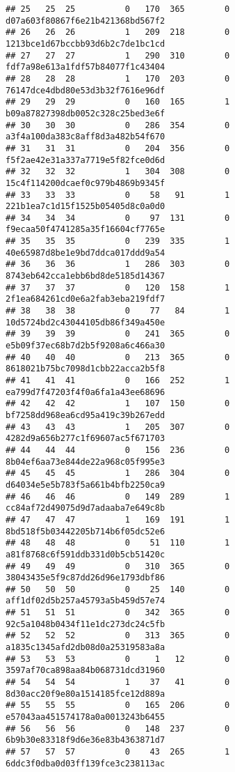 \documentclass[
]{article}
\begin{document}
\begin{verbatim}
## 25   25  25          0   170  365        0 d07a603f80867f6e21b421368bd567f2
## 26   26  26          1   209  218        0 1213bce1d67bccbb93d6b2c7de1bc1cd
## 27   27  27          1   290  310        0 fdf7a98e613a1fdf57b84077f1c43404
## 28   28  28          1   170  203        0 76147dce4dbd80e53d3b32f7616e96df
## 29   29  29          0   160  165        1 b09a87827398db0052c328c25bed3e6f
## 30   30  30          0   286  354        0 a3f4a100da383c8aff8d3a482b54f670
## 31   31  31          0   204  356        0 f5f2ae42e31a337a7719e5f82fce0d6d
## 32   32  32          1   304  308        0 15c4f114200dcaef0c979b4869b9345f
## 33   33  33          0    58   91        1 221b1ea7c1d15f1525b05405d8c0a0d0
## 34   34  34          0    97  131        0 f9ecaa50f4741285a35f16604cf7765e
## 35   35  35          0   239  335        1 40e65987d8be1e9bd7ddca017ddd9a54
## 36   36  36          1   286  303        0 8743eb642cca1ebb6bd8de5185d14367
## 37   37  37          0   120  158        1 2f1ea684261cd0e6a2fab3eba219fdf7
## 38   38  38          0    77   84        1 10d5724bd2c43044105db86f349a450e
## 39   39  39          0   241  365        0 e5b09f37ec68b7d2b5f9208a6c466a30
## 40   40  40          0   213  365        0 8618021b75bc7098d1cbb22acca2b5f8
## 41   41  41          0   166  252        1 ea799d7f47203f4f0a6fa1a43ee68696
## 42   42  42          1   107  150        0 bf7258dd968ea6cd95a419c39b267edd
## 43   43  43          1   205  307        0 4282d9a656b277c1f69607ac5f671703
## 44   44  44          0   156  236        0 8b04ef6aa73e844de22a968c05f995e3
## 45   45  45          1   286  304        0 d64034e5e5b783f5a661b4bfb2250ca9
## 46   46  46          0   149  289        1 cc84af72d49075d9d7adaaba7e649c8b
## 47   47  47          1   169  191        1 8bd518f5b03442205b714b6f05dc52e6
## 48   48  48          0    51  110        1 a81f8768c6f591ddb331d0b5cb51420c
## 49   49  49          0   310  365        0 38043435e5f9c87dd26d96e1793dbf86
## 50   50  50          0    25  140        0 aff1df02d5b257a45793a5b459d57e74
## 51   51  51          0   342  365        0 92c5a1048b0434f11e1dc273dc24c5fb
## 52   52  52          0   313  365        0 a1835c1345afd2db08d0a25319583a8a
## 53   53  53          0     1   12        0 3597af70ca898aa84b068731dcd31960
## 54   54  54          1    37   41        0 8d30acc20f9e80a1514185fce12d889a
## 55   55  55          0   165  206        0 e57043aa451574178a0a0013243b6455
## 56   56  56          0   148  237        0 6b9b30e83318f9d6e36e83b4363871d7
## 57   57  57          0    43  265        1 6ddc3f0dba0d03ff139fce3c238113ac

\end{verbatim}
\end{document}
